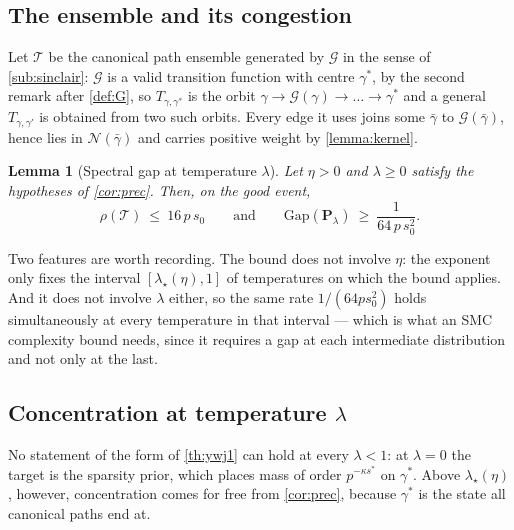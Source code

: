 \documentclass[aos]{imsart}
\theoremstyle{plain}
\newtheorem{lemma}{Lemma}[section]
\theoremstyle{definition}
\begin{document}
    \subsection{The ensemble and its congestion}
    \label{sub:congestion}

    Let $\mathcal{T}$ be the canonical path ensemble generated by
    $\mathcal{G}$ in the sense of \cref{sub:sinclair}: $\mathcal{G}$ is a
    valid transition function with centre $\gamma^{\ast}$, by the second
    remark after \cref{def:G}, so $T_{\gamma,\gamma^{\ast}}$ is the orbit
    $\gamma\to\mathcal{G}(\gamma)\to\dots\to\gamma^{\ast}$ and a general
    $T_{\gamma,\gamma'}$ is obtained from two such orbits. Every edge it
    uses joins some $\bar\gamma$ to $\mathcal{G}(\bar\gamma)$, hence lies in
    $\mathcal{N}(\bar\gamma)$ and carries positive weight by
    \cref{lemma:kernel}.

    \begin{lemma}[Spectral gap at temperature $\lambda$]
        \label{lemma:gap}
        Let $\eta>0$ and $\lambda\geq0$ satisfy the hypotheses of
        \cref{cor:prec}. Then, on the good event,
        \begin{equation}
            \label{eq:gap}
            \rho(\mathcal{T})\ \leq\ 16\,p\,s_0
            \qquad\text{and}\qquad
            \mathrm{Gap}(\mathbf{P}_\lambda)\ \geq\ \frac{1}{64\,p\,s_0^{2}} .
        \end{equation}
    \end{lemma}


    Two features are worth recording. The bound does not involve $\eta$: the
    exponent only fixes the interval $[\lambda_\star(\eta),1]$ of
    temperatures on which the bound applies. And it does not involve
    $\lambda$ either, so the
    same rate $1/(64ps_0^{2})$ holds simultaneously at every temperature in
    that interval --- which is what an SMC complexity bound needs, since it
    requires a gap at each intermediate distribution and not only at the
    last.

    \subsection{Concentration at temperature $\lambda$}
    \label{sub:concentration}

    No statement of the form of \cref{th:ywj1} can hold at every
    $\lambda<1$: at $\lambda=0$ the target is the sparsity prior, which
    places mass of order $p^{-\kappa s^{\ast}}$ on $\gamma^{\ast}$. Above
    $\lambda_\star(\eta)$, however, concentration comes for free from
    \cref{cor:prec}, because $\gamma^{\ast}$ is the state all canonical
    paths end at.
\end{document}
